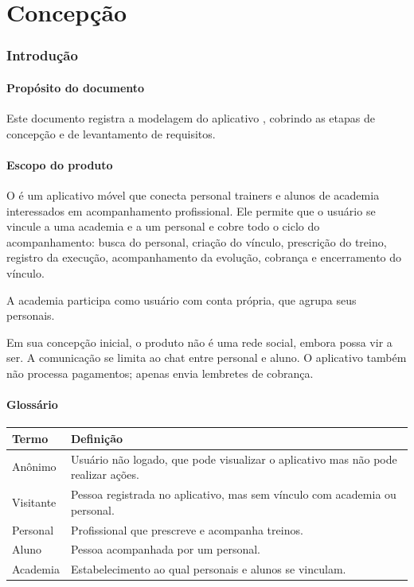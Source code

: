 \part{Concepção}

\section{Introdução}

\subsection{Propósito do documento}
Este documento registra a modelagem do aplicativo \nomeapp{}, cobrindo as etapas de concepção e de levantamento de requisitos.

\subsection{Escopo do produto}
O \nomeapp{} é um aplicativo móvel que conecta personal trainers e alunos de academia interessados em acompanhamento profissional. Ele permite que o usuário se vincule a uma academia e a um personal e cobre todo o ciclo do acompanhamento: busca do personal, criação do vínculo, prescrição do treino, registro da execução, acompanhamento da evolução, cobrança e encerramento do vínculo.

A academia participa como usuário com conta própria, que agrupa seus personais.

Em sua concepção inicial, o produto não é uma rede social, embora possa vir a ser. A comunicação se limita ao chat entre personal e aluno. O aplicativo também não processa pagamentos; apenas envia lembretes de cobrança.

\subsection{Glossário}
\begin{tabularx}{\textwidth}{@{}l L@{}}
  \toprule
  \textbf{Termo} & \textbf{Definição} \\
  \midrule
  Anônimo   & Usuário não logado, que pode visualizar o aplicativo mas não pode realizar ações. \\
  Visitante & Pessoa registrada no aplicativo, mas sem vínculo com academia ou personal. \\
  Personal  & Profissional que prescreve e acompanha treinos. \\
  Aluno     & Pessoa acompanhada por um personal. \\
  Academia  & Estabelecimento ao qual personais e alunos se vinculam. \\
  \bottomrule
\end{tabularx}

